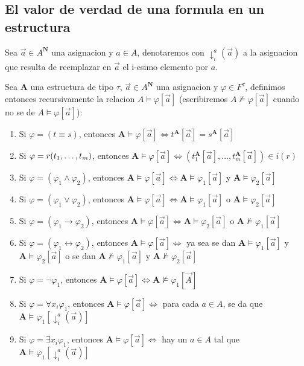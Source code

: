 \subsection{El valor de verdad de una formula en un estructura}
\begin{definition}
  Sea $\vec{a} \in A^\mathbf{N}$ una asignacion y $a \in A$, denotaremos con $\downarrow_i^a(\vec{a})$ a la asignacion
  que resulta de reemplazar en $\vec{a}$ el i-esimo elemento por $a$. 
\end{definition}
\begin{definition}
  Sea $\mathbf{A}$ una estructura de tipo $\tau$, $\vec{a} \in A^\mathbf{N}$ una asignacion y $\varphi \in F^\tau$, definimos entonces
  recursivamente la relacion $A \models \varphi[\vec{a}]$ (escribiremos $A \not\models \varphi[\vec{a}]$ cuando no se de $A \models \varphi[\vec{a}]$):
  \begin{enumerate}
    \item Si $\varphi = (t\equiv s)$, entonces $\mathbf{A} \models \varphi[\vec{a}] \iff t^\mathbf{A}[\vec{a}] = s^\mathbf{A}[\vec{a}]$
    \item Si $\varphi = r(t_{1}, \dots, t_{m})$, entonces $\mathbf{A} \models \varphi[\vec{a}] \iff (t_1^\mathbf{A}[\vec{a}], \dots, t_m^\mathbf{A}[\vec{a}]) \in i(r)$
    \item Si $\varphi = (\varphi_1 \land \varphi_2)$, entonces $\mathbf{A} \models \varphi[\vec{a}] \iff \mathbf{A}\models\varphi_1[\vec{a}]$ y $\mathbf{A}\models\varphi_2[\vec{a}]$ 
    \item Si $\varphi = (\varphi_1 \lor \varphi_2)$, entonces $\mathbf{A} \models \varphi[\vec{a}] \iff \mathbf{A}\models\varphi_1[\vec{a}]$ o $\mathbf{A}\models\varphi_2[\vec{a}]$ 
    \item Si $\varphi = (\varphi_1 \rightarrow \varphi_2)$, entonces $\mathbf{A}\models\varphi[\vec{a}] \iff \mathbf{A}\models\varphi_2[\vec{a}]$ o $\mathbf{A}\not\models\varphi_1[\vec{a}]$
    \item Si $\varphi = (\varphi_1 \leftrightarrow \varphi_2)$, entonces $\mathbf{A}\models\varphi[\vec{a}] \iff $ ya sea se dan $\mathbf{A}\models\varphi_1[\vec{a}]$ y $\mathbf{A}\models\varphi_2[\vec{a}]$ o se dan $\mathbf{A}\not\models\varphi_1[\vec{a}]$ y $\mathbf{A}\not\models\varphi_2[\vec{a}]$
    \item Si $\varphi = \neg\varphi_1$, entonces $\mathbf{A}\models\varphi[\vec{a}] \iff \mathbf{A}\not\models\varphi_1[\vec{A}]$
    \item Si $\varphi = \forall x_i \varphi_1$, entonces $\mathbf{A}\models\varphi[\vec{a}] \iff $ para cada $a \in A$, se da que $\mathbf{A}\models\varphi_1[\downarrow_i^a(\vec{a})]$
    \item Si $\varphi = \exists x_i \varphi_1$, entonces $\mathbf{A}\models\varphi[\vec{a}] \iff $ hay un $a \in A$ tal que $\mathbf{A}\models\varphi_1[\downarrow_i^a(\vec{a})]$
  \end{enumerate}


\end{definition}
